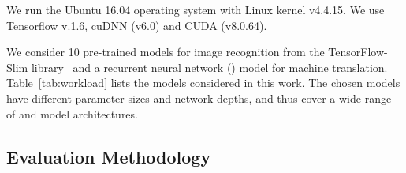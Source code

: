  We run the Ubuntu 16.04 operating system with Linux kernel v4.4.15. We use Tensorflow v.1.6, cuDNN (v6.0) and
CUDA (v8.0.64).


 We consider 10 pre-trained \CNN models for image recognition from the TensorFlow-Slim
library~\cite{silberman2013tensorflow} and a recurrent neural network (\RNN) model for machine translation. Table~\ref{tab:workload} lists
the models considered in this work. The chosen models have different parameter sizes and network depths, and thus cover a wide range of
\CNN and \RNN model architectures.


\subsection{Evaluation Methodology \label{sec:method}}

